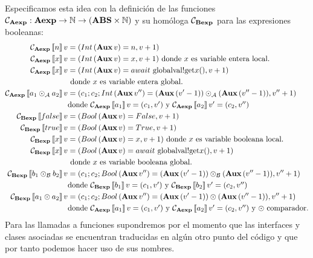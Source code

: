 Especificamos esta idea con la definición de las funciones $\C_\AExp: \AExp \rightarrow \Nat \rightarrow (\ABS \times \Nat)$ y su homóloga  $\C_\BExp$ para las expresiones booleanas:
\begin{align*}
  \C_\AExp\eval{n} v &= (Int\, (\Aux\, v) = n, v + 1) \\
  \C_\AExp\eval{x} v &= (Int\, (\Aux\, v) = x, v + 1) \mbox{ donde $x$ es variable entera local.} \\
  \C_\AExp\eval{x} v &= (Int\, (\Aux\, v) = await \mbox{ globalval!get}x(), v + 1) \\
  &\mbox{ donde $x$ es variable entera global.} \\
  \C_\AExp\eval{a_1 \odot_\A a_2} v &= (c_1\; c_2 \; Int\, (\Aux\, v'') =  (\Aux\, (v' - 1))  \odot_\A  (\Aux\, (v'' - 1)) , v'' + 1) \\
  &\mbox{donde $\C_\AExp\eval{a_1} v = (c_1, v')$ y $\C_\AExp\eval{a_2}v' = (c_2, v'')$} \\
  \C_\BExp\eval{false} v &= (Bool\, (\Aux\, v) = False, v + 1) \\
  \C_\BExp\eval{true} v &= (Bool\, (\Aux\, v) = True, v + 1) \\
  \C_\BExp\eval{x} v &= (Bool\, (\Aux\, v) = x, v + 1) \mbox{ donde $x$ es variable booleana local.} \\
  \C_\BExp\eval{x} v &= (Bool\, (\Aux\, v) = await \mbox{ globalval!get}x(), v + 1) \\
  &\mbox{ donde $x$ es variable booleana global.} \\
  \C_\BExp\eval{b_1 \odot_\Bb b_2} v &= (c_1\; c_2 \; Bool\, (\Aux\, v'') =  (\Aux\, (v' - 1))  \odot_\Bb  (\Aux\, (v'' - 1)) , v'' + 1) \\
  &\mbox{donde $\C_\BExp\eval{b_1} v = (c_1, v')$ y $\C_\BExp\eval{b_2}v' = (c_2, v'')$} \\
  \C_\BExp\eval{a_1 \odot a_2} v &= (c_1\; c_2 \; Bool\, (\Aux\, v'') =  (\Aux\, (v' - 1))  \odot  (\Aux\, (v'' - 1)) , v'' + 1) \\
  &\mbox{donde $\C_\AExp\eval{a_1} v = (c_1, v')$ y $\C_\AExp\eval{a_2}v' = (c_2, v'')$ y $\odot$ comparador.}
\end{align*}
Para las llamadas a funciones supondremos por el momento que las interfaces y clases asociadas se encuentran traducidas en algún otro punto del código y que por tanto podemos hacer uso de sus nombres.

